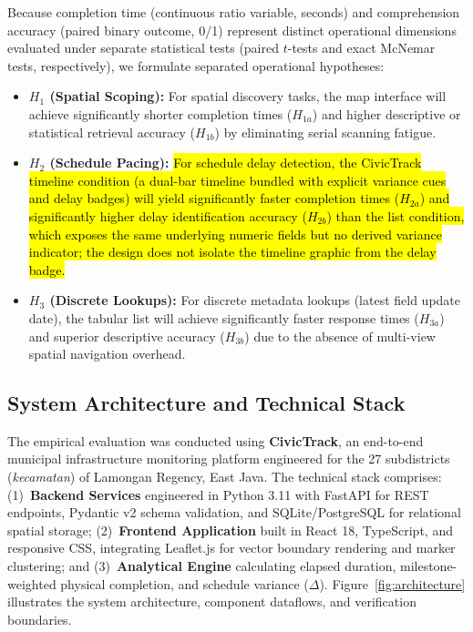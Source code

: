 \documentclass[runningheads]{llncs}
\begin{document}
Because completion time (continuous ratio variable, seconds) and comprehension accuracy (paired binary outcome, 0/1) represent distinct operational dimensions evaluated under separate statistical tests (paired $t$-tests and exact McNemar tests, respectively), we formulate separated operational hypotheses:
\begin{itemize}\setlength{\itemsep}{1.2pt}\setlength{\parskip}{0pt}
    \item \textbf{$H_1$ (Spatial Scoping):} For spatial discovery tasks, the map interface will achieve significantly shorter completion times ($H_{1a}$) and higher descriptive or statistical retrieval accuracy ($H_{1b}$) by eliminating serial scanning fatigue.
    \item \textbf{$H_2$ (Schedule Pacing):} \hl{For schedule delay detection, the CivicTrack timeline condition (a dual-bar timeline bundled with explicit variance cues and delay badges) will yield significantly faster completion times ($H_{2a}$) and significantly higher delay identification accuracy ($H_{2b}$) than the list condition, which exposes the same underlying numeric fields but no derived variance indicator; the design does not isolate the timeline graphic from the delay badge.}
    \item \textbf{$H_3$ (Discrete Lookups):} For discrete metadata lookups (latest field update date), the tabular list will achieve significantly faster response times ($H_{3a}$) and superior descriptive accuracy ($H_{3b}$) due to the absence of multi-view spatial navigation overhead.
\end{itemize}

\subsection{System Architecture and Technical Stack}
The empirical evaluation was conducted using \textbf{CivicTrack}, an end-to-end municipal infrastructure monitoring platform engineered for the 27 subdistricts (\emph{kecamatan}) of Lamongan Regency, East Java. The technical stack comprises: (1)~\textbf{Backend Services} engineered in Python 3.11 with FastAPI for REST endpoints, Pydantic v2 schema validation, and SQLite/PostgreSQL for relational spatial storage; (2)~\textbf{Frontend Application} built in React 18, TypeScript, and responsive CSS, integrating Leaflet.js for vector boundary rendering and marker clustering; and (3)~\textbf{Analytical Engine} calculating elapsed duration, milestone-weighted physical completion, and schedule variance ($\Delta$). Figure~\ref{fig:architecture} illustrates the system architecture, component dataflows, and verification boundaries.
\end{document}
